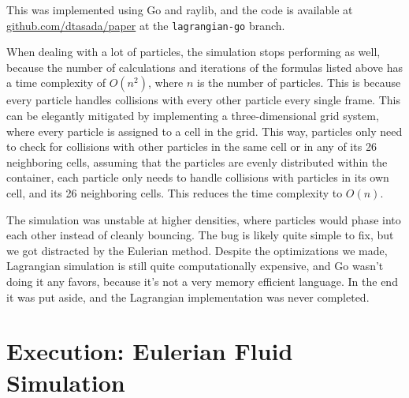 \documentclass[a4paper,12pt,titlepage]{article}
\begin{document}
This was implemented using Go and raylib, and the code is available at
\href{www.github.com/dtasada/paper}{github.com/dtasada/paper} at the \lstinline[breaklines]{lagrangian-go} branch.

When dealing with a lot of particles, the simulation stops performing as well,
because the number of calculations and iterations of the formulas listed above
has a time complexity of $O(n^2)$, where $n$ is the number of particles. This is
because every particle handles collisions with every other particle every
single frame. This can be elegantly mitigated by implementing a three-dimensional
grid system, where every particle is assigned to a cell in the grid. This way,
particles only need to check for collisions with other particles in the same cell
or in any of its 26 neighboring cells, assuming that the particles are evenly
distributed within the container, each particle only needs to handle collisions
with particles in its own cell, and its 26 neighboring cells. This reduces the
time complexity to $O(n)$.

The simulation was unstable at higher densities, where particles would phase
into each other instead of cleanly bouncing. The bug is likely quite simple to
fix, but we got distracted by the Eulerian method. Despite the optimizations we
made, Lagrangian simulation is still quite computationally expensive, and Go
wasn't doing it any favors, because it's not a very memory efficient language.
In the end it was put aside, and the Lagrangian implementation was never completed.

\pagebreak
\section{Execution: Eulerian Fluid Simulation}
\end{document}
